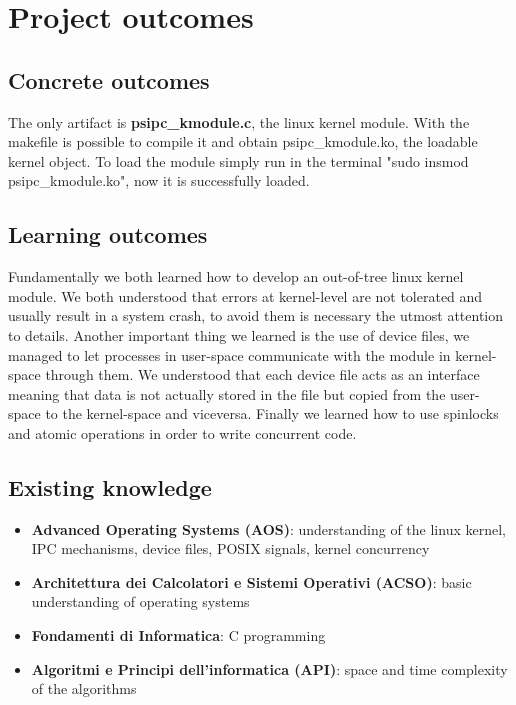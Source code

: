 \documentclass[10pt,a4]{article}
\begin{document}
\section{Project outcomes}

\subsection{Concrete outcomes}
The only artifact is \textbf{psipc\_kmodule.c}, the linux kernel module.
With the makefile is possible to compile it and obtain psipc\_kmodule.ko, the loadable kernel object.
To load the module simply run in the terminal "sudo insmod psipc\_kmodule.ko", now it is successfully loaded.

\subsection{Learning outcomes}

Fundamentally we both learned how to develop an out-of-tree linux kernel module.
We both understood that errors at kernel-level are not tolerated and usually result in a system crash, to avoid them is necessary the utmost attention to details.
Another important thing we learned is the use of device files, we managed to let processes in user-space communicate with the module in kernel-space through them.
We understood that each device file acts as an interface meaning that data is not actually stored in the file but copied from the user-space to the kernel-space and viceversa.
Finally we learned how to use spinlocks and atomic operations in order to write concurrent code.

\subsection{Existing knowledge}
\begin{itemize}
  \item \textbf{Advanced Operating Systems (AOS)}: understanding of the linux kernel, IPC mechanisms, device files, POSIX signals, kernel concurrency
  \item \textbf{Architettura dei Calcolatori e Sistemi Operativi (ACSO)}: basic understanding of operating systems
  \item \textbf{Fondamenti di Informatica}: C programming
  \item \textbf{Algoritmi e Principi dell'informatica (API)}: space and time complexity of the algorithms
\end{itemize}
\end{document}
